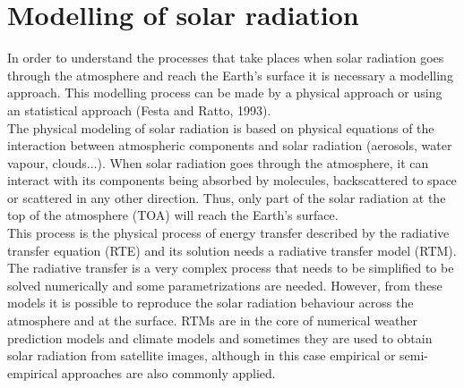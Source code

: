

\section{Modelling of solar radiation}

In order to understand the processes that take places when solar radiation goes through the atmosphere and reach the Earth's surface it is necessary a modelling approach. This modelling process can be made by a physical approach or using an statistical approach (Festa and Ratto, 1993).\\

The physical modeling of solar radiation is based on physical equations of the interaction between atmospheric components and solar radiation (aerosols, water vapour, clouds...). When solar radiation goes through the atmosphere, it can interact with its components being absorbed by molecules, backscattered to space or scattered in any other direction. Thus, only part of the solar radiation at the top of the atmosphere (TOA) will reach the Earth's surface.\\ 

This process is the physical process of energy transfer described by the radiative transfer equation (RTE) and its solution needs a radiative transfer model (RTM). The radiative transfer is a very complex process that needs to be simplified to be solved numerically and some parametrizations are needed. However, from these models it is possible to reproduce the solar radiation behaviour across the atmosphere and at the surface. RTMs are in the core of numerical weather prediction models and climate models and sometimes they are used to obtain solar radiation from satellite images, although in this case empirical or semi-empirical approaches are also commonly applied.\\

